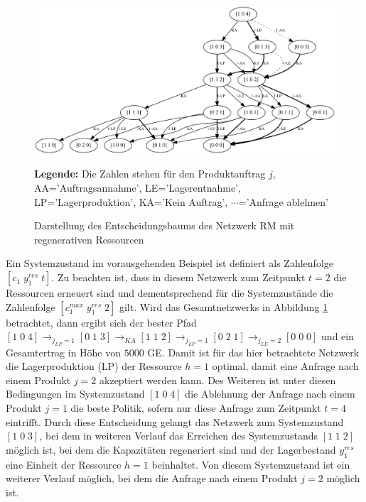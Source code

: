 \begin{figure}[h!]
  \begin{center}
    \includegraphics[width=140mm]{Bilder/Beispiel6.pdf}
    \caption{Darstellung des Entscheidungsbaums des Netzwerk RM mit regenerativen Ressourcen}  \label{B6}
    {\footnotesize \textbf{Legende:} Die Zahlen stehen für den Produktauftrag $j$, AA='Auftragsannahme', LE='Lagerentnahme', LP='Lagerproduktion', KA='Kein Auftrag', $\cdots$='Anfrage ablehnen'} 
  \end{center}
\end{figure}

Ein Systemzustand im vorausgehenden Beispiel ist definiert als Zahlenfolge $[c_1\;y^{res}_1\;t]$. Zu beachten ist, dass in diesem Netzwerk zum Zeitpunkt $t=2$ die Ressourcen erneuert sind und dementsprechend für die Systemzustände die Zahlenfolge $[c_1^{max}\;y^{res}_1\;2]$ gilt. Wird das Gesamtnetzwerks in Abbildung \ref{B6} betrachtet, dann ergibt sich der bester Pfad $[1\;0\;4] \rightarrow_{j_{LP}=1} [0\;1\;3] \rightarrow_{KA} [1\;1\;2] \rightarrow_{j_{LP}=1} [0\;2\;1] \rightarrow_{j_{LE}=2} [0\;0\;0]$ und ein Gesamtertrag in Höhe von $5000$ GE. Damit ist für das hier betrachtete Netzwerk die Lagerproduktion (LP) der Ressource $h=1$ optimal, damit eine Anfrage nach einem Produkt $j=2$ akzeptiert werden kann. Des Weiteren ist unter diesen Bedingungen im Systemzustand $[1\;0\;4]$ die Ablehnung der Anfrage nach einem Produkt $j=1$ die beste Politik, sofern nur diese Anfrage zum Zeitpunkt $t=4$ eintrifft. Durch diese Entscheidung gelangt das Netzwerk zum Systemzustand $[1\;0\;3]$, bei dem in weiteren Verlauf das Erreichen des Systemzustands $[1\;1\;2]$ möglich ist, bei dem die Kapazitäten regeneriert sind und der Lagerbestand $y_1^{res}$ eine Einheit der Ressource $h=1$ beinhaltet. Von diesem Systemzustand ist ein weiterer Verlauf möglich, bei dem die Anfrage nach einem Produkt $j=2$ möglich ist.

